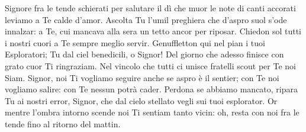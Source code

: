 \beginverse
Signore fra le tende schierati
per salutare il dì che muor
le note di canti accorati
leviamo a Te calde d'amor.
Ascolta Tu l'umil preghiera
che d'aspro suol s'ode innalzar:
a Te, cui mancava alla sera
un tetto ancor per riposar.
\endverse
\beginchorus
Chiedon sol tutti i nostri cuori
a Te sempre meglio servir.
Genuffletton qui nel pian
i tuoi Esploratori;
Tu dal ciel benedicili, o Signor!
\endchorus
\beginverse
Del giorno che adesso finisce
con grato cuor Ti ringraziam.
Nel vincolo che tutti ci unisce
fratelli scout per Te noi Siam.
Signor, noi Ti vogliamo seguire
anche se aspro è il sentier;
con Te noi vogliamo salire:
con Te nessun potrà cader.
\endverse \beginverse
Perdona se abbiamo mancato,
ripara Tu ai nostri error,
Signor, che dal cielo stellato
vegli sui tuoi esplorator.
Or mentre l'ombra intorno scende
noi Ti sentiam tanto vicin:
oh, resta con noi fra le tende
fino al ritorno del mattin.
\endverse
\endsong
